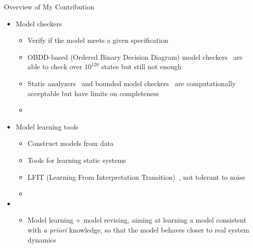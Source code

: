 \begin{frame}{Overview of My Contribution}
\begin{itemize}[<+->]
    \item Model checkers
    \begin{itemize}
        \item Verify if the model meets a given specification
        \item OBDD-based (Ordered Binary Decision Diagram) model checkers~\cite{brayton1996vis,cimatti2000nusmv} are able to check over $10^{120}$ states but still not enough
        \item Static analyzers~\cite{pauleve2012} and bounded model checkers~\cite{clarke2001bounded} are computationally acceptable but have limits on completeness
        \item {}
    \end{itemize}
    \item Model learning tools
    \begin{itemize}
    	\item Construct models from data
        \item Tools for learning static systems~\cite{mochida2018statistical}
        \item LFIT (Learning From Interpretation Transition)~\cite{ribeiro2018learning}, not tolerant to noise
        \item {}  
    \end{itemize}
    \item {}
    \begin{itemize}
        \item Model learning + model revising, aiming at learning a model consistent with \textit{a priori} knowledge, so that the model behaves closer to real system dynamics
    \end{itemize}
\end{itemize}

\vspace{0.5cm}
\Large
{}
\end{frame}
